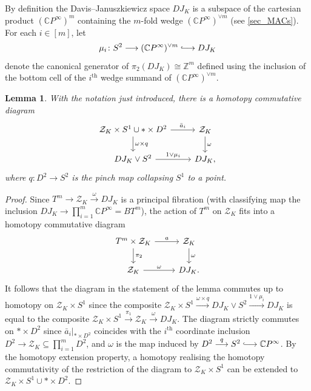 \documentclass[a4paper,10pt]{amsart}
\newtheorem{lemma}[theorem]{Lemma}
\theoremstyle{definition}
\theoremstyle{remark}
\begin{document}
By definition the Davis--Januszkiewicz space $DJ_K$ is a subspace of the cartesian product $(\mathbb{C}P^\infty)^m$ containing the $m$-fold wedge $(\mathbb{C}P^\infty)^{\vee m}$ (see \cref{sec_MACs}). For each $i\in[m]$, let
\[
\mu_i\colon S^2 \longrightarrow (\mathbb{C}P^\infty)^{\vee m} \lhook\joinrel\longrightarrow DJ_K 
\]
denote the canonical generator of  $\pi_2(DJ_K)\cong\mathbb{Z}^m$ defined using the inclusion of the bottom cell of the $i^\text{th}$ wedge summand of $(\mathbb{C}P^\infty)^{\vee m}$.

\begin{lemma} \label{comm_square}
With the notation just introduced, there is a homotopy commutative diagram
\[
\begin{tikzcd}
\mathcal{Z}_K\times S^1 \cup *\times D^2 \ar[r,"\bar{a}_i"] \ar[d,"\omega\times q"] & \mathcal{Z}_K \ar[d,"\omega"] \\
DJ_K\vee S^2 \ar[r,"1\vee\mu_i"] & DJ_K,
\end{tikzcd}
\]
where $q\colon D^2\to S^2$ is the pinch map collapsing $S^1$ to a point. 
\end{lemma}

\begin{proof}
Since $T^m\to \mathcal{Z}_K\xrightarrow{\omega} DJ_K$ is a principal fibration (with classifying map the inclusion $DJ_K\to \prod_{i=1}^m\mathbb{C}P^\infty=BT^m$), the action of $T^m$ on $\mathcal{Z}_K$ fits into a homotopy commutative diagram
\[
\begin{tikzcd}
T^m\times\mathcal{Z}_K \ar[r,"a"] \ar[d,"\pi_2"] & \mathcal{Z}_K \ar[d,"\omega"] \\
\mathcal{Z}_K \ar[r,"\omega"] & DJ_K.
\end{tikzcd}
\]
It follows that the diagram in the statement of the lemma commutes up to homotopy on $\mathcal{Z}_K\times S^1$ since the composite $\mathcal{Z}_K\times S^1 \xrightarrow{\omega\times q} DJ_K\vee S^2 \xrightarrow{1\vee\mu_i} DJ_K$ is equal to the composite $\mathcal{Z}_K\times S^1 \xrightarrow{\pi_1} \mathcal{Z}_K \xrightarrow{\omega} DJ_K$. The diagram strictly commutes on $*\times D^2$ since $\bar{a}_i|_{*\times D^2}$ coincides with the $i^\text{th}$ coordinate inclusion $D^2 \to \mathcal{Z}_K\subseteq \prod_{i=1}^m D^2$, and $\omega$ is the map induced by $D^2 \stackrel{q}{\longrightarrow} S^2\lhook\joinrel\longrightarrow \mathbb{C}P^\infty$. By the homotopy extension property, a homotopy realising the homotopy commutativity of the restriction of the diagram to $\mathcal{Z}_K\times S^1$ can be extended to $\mathcal{Z}_K\times S^1 \cup *\times D^2$.
\end{proof}
\end{document}
